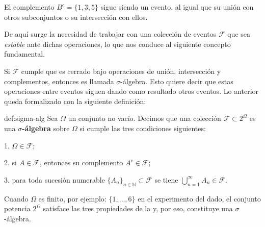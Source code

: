 \documentclass[../Main.tex]{subfiles}
\begin{document}
\begin{remark}{}{}
    El complemento \(B^{c}=\{1,3,5\}\) sigue siendo un evento, al igual que su unión con otros subconjuntos o su intersección con ellos.  
\end{remark}
De aquí surge la necesidad de trabajar con una colección de eventos \(\mathcal{F}\) que sea \emph{estable} ante dichas operaciones, lo que nos conduce al siguiente concepto fundamental.

Si $\mathcal{F}$ cumple que es cerrado bajo operaciones de unión, intersección y complementos, entonces es llamada $\sigma$-álgebra. Esto quiere decir que estas operaciones entre eventos siguen dando como resultado otros eventos. Lo anterior queda formalizado con la siguiente definición:

\begin{definition}{}{def:sigma-alg}
    Sea \(\Omega\) un conjunto no vacío. Decimos que una colección \(\mathcal{F}\subset 2^{\Omega}\) es una \textbf{\(\sigma\)-álgebra} sobre \(\Omega\) si cumple las tres condiciones siguientes:  

1. \(\Omega\in\mathcal{F}\);  

2. si \(A\in\mathcal{F}\), entonces su complemento \(A^{c}\in\mathcal{F}\);  

3. para toda sucesión numerable \(\{A_{n}\}_{n\in\mathbb{N}}\subset\mathcal{F}\) se tiene \(\displaystyle \bigcup_{n=1}^{\infty} A_{n}\in\mathcal{F}\).
\end{definition}

Cuando \(\Omega\) es finito, por ejemplo: \(\{1,\dots,6\}\) en el experimento del dado, el conjunto potencia \(2^{\Omega}\) satisface las tres propiedades de la  y, por eso, constituye una \(\sigma\)-álgebra.


\end{document}
